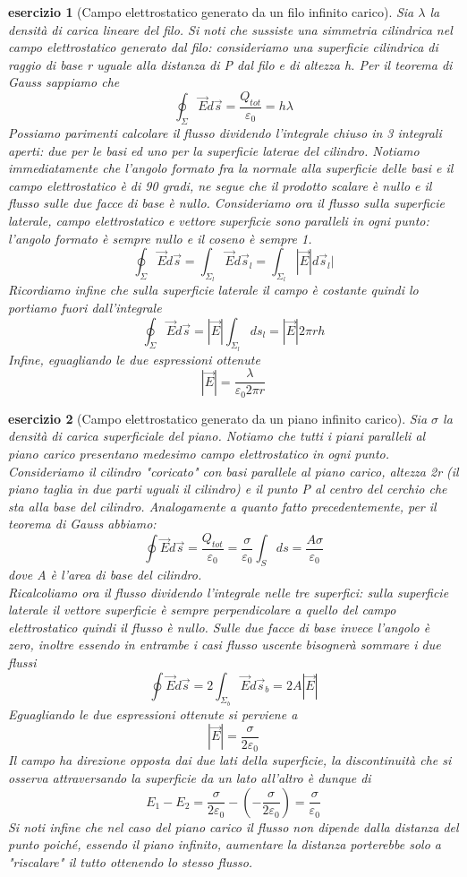 \documentclass[10pt,a4paper]{article}
\newtheorem{esercizio}{esercizio}
\begin{document}
\begin{esercizio}[Campo elettrostatico generato da un filo infinito carico]
Sia $\lambda$ la densità di carica lineare del filo. Si noti che sussiste una simmetria cilindrica nel campo elettrostatico generato dal filo: consideriamo una superficie cilindrica di raggio di base r uguale alla distanza di P dal filo e di altezza h. Per il teorema di Gauss sappiamo che
\[\oint_{\Sigma}\vec{E}d\vec{s}=\frac{Q_{tot}}{\varepsilon_0} = h\lambda\]
Possiamo parimenti calcolare il flusso dividendo l'integrale chiuso in 3 integrali aperti: due per le basi ed uno per la superficie laterae del cilindro. Notiamo immediatamente che l'angolo formato fra la normale alla superficie delle basi e il campo elettrostatico è di 90 gradi, ne segue che il prodotto scalare è nullo e il flusso sulle due facce di base è nullo. Consideriamo ora il flusso sulla superficie laterale, campo elettrostatico e vettore superficie sono paralleli in ogni punto: l'angolo formato è sempre nullo e il coseno è sempre 1.
\[\oint_{\Sigma}\vec{E}d\vec{s}=\int_{\Sigma_l}\vec{E}d\vec{s}_l= \int_{\Sigma_l}|\vec{E}|d\vec{s}_l|\]
Ricordiamo infine che sulla superficie laterale il campo è costante quindi lo portiamo fuori dall'integrale
\[\oint_{\Sigma}\vec{E}d\vec{s}=|\vec{E}|\int_{\Sigma_l}ds_l=|\vec{E}|2\pi r h\]
Infine, eguagliando le due espressioni ottenute
\[|\vec{E}|= \frac{\lambda}{\varepsilon_0 2\pi r }\]
\end{esercizio}
\begin{esercizio}[Campo elettrostatico generato da un piano infinito carico]\label{es:campo_piano_infinito}
Sia $\sigma$ la densità di carica superficiale del piano. Notiamo che tutti i piani paralleli al piano carico presentano medesimo campo elettrostatico in ogni punto. Consideriamo il cilindro "coricato" con basi parallele al piano carico, altezza 2r (il piano taglia in due parti uguali il cilindro) e il punto P al centro del cerchio che sta alla base del cilindro. Analogamente a quanto fatto precedentemente, per il teorema di Gauss abbiamo:
\[\oint\vec{E}d\vec{s} = \frac{Q_{tot}}{\varepsilon_0}=\frac{\sigma}{\varepsilon_0}\int_Sds=\frac{A\sigma}{\varepsilon_0}\]
dove A è l'area di base del cilindro.\\
Ricalcoliamo ora il flusso dividendo l'integrale nelle tre superfici: sulla superficie laterale il vettore superficie è sempre perpendicolare a quello del campo elettrostatico quindi il flusso è nullo. Sulle due facce di base invece l'angolo è zero, inoltre essendo in entrambe i casi flusso uscente bisognerà sommare i due flussi
  \[\oint\vec{E}d\vec{s} = 2\int_{\Sigma_b}\vec{E}d\vec{s}_b= 2A|\vec{E}|\]
Eguagliando le due espressioni ottenute si perviene a 
\[|\vec{E}|=\frac{\sigma}{2\varepsilon_0}\]
Il campo ha direzione opposta dai due lati della superficie, la discontinuità che si osserva attraversando la superficie da un lato all'altro è dunque di
\[E_1-E_2 = \frac{\sigma}{2\varepsilon_0}-\left(-\frac{\sigma}{2\varepsilon_0}\right) = \frac{\sigma}{\varepsilon_0}\]
Si noti infine che nel caso del piano carico il flusso non dipende dalla distanza del punto poiché, essendo il piano infinito, aumentare la distanza porterebbe solo a "riscalare" il tutto ottenendo lo stesso flusso.
\end{esercizio}
\end{document}
